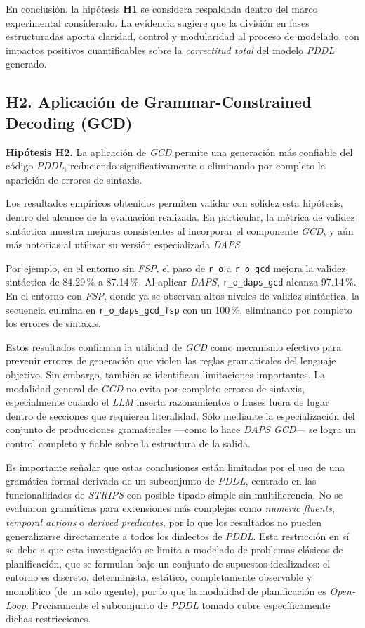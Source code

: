 En conclusión, la hipótesis \textbf{H1} se considera respaldada dentro del marco experimental considerado. La evidencia sugiere que la división en fases estructuradas aporta claridad, control y modularidad al proceso de modelado, con impactos positivos cuantificables sobre la \textit{correctitud total} del modelo \textit{PDDL} generado.

\subsection*{H2. Aplicación de Grammar-Constrained Decoding (GCD)}

\textbf{Hipótesis H2.} La aplicación de \textit{GCD}  permite una generación más confiable del código \textit{PDDL}, reduciendo significativamente o eliminando por completo la aparición de errores de sintaxis.

Los resultados empíricos obtenidos permiten validar con solidez esta hipótesis, dentro del alcance de la evaluación realizada. En particular, la métrica de validez sintáctica muestra mejoras consistentes al incorporar el componente \textit{GCD}, y aún más notorias al utilizar su versión especializada \textit{DAPS}.

Por ejemplo, en el entorno sin \textit{FSP}, el paso de \texttt{r\_o} a \texttt{r\_o\_gcd} mejora la validez sintáctica de 84.29\,\% a 87.14\,\%. Al aplicar \textit{DAPS}, \texttt{r\_o\_daps\_gcd} alcanza 97.14\,\%. En el entorno con \textit{FSP}, donde ya se observan altos niveles de validez sintáctica, la secuencia culmina en \texttt{r\_o\_daps\_gcd\_fsp} con un 100\,\%, eliminando por completo los errores de sintaxis.

Estos resultados confirman la utilidad de \textit{GCD} como mecanismo efectivo para prevenir errores de generación que violen las reglas gramaticales del lenguaje objetivo. Sin embargo, también se identifican limitaciones importantes. La modalidad general de \textit{GCD} no evita por completo errores de sintaxis, especialmente cuando el \textit{LLM} inserta razonamientos o frases fuera de lugar dentro de secciones que requieren literalidad. Sólo mediante la especialización del conjunto de producciones gramaticales —como lo hace \textit{DAPS GCD}— se logra un control completo y fiable sobre la estructura de la salida.

Es importante señalar que estas conclusiones están limitadas por el uso de una gramática formal derivada de un subconjunto de \textit{PDDL}, centrado en las funcionalidades de \textit{STRIPS} con posible tipado simple sin multiherencia. No se evaluaron gramáticas para extensiones más complejas como \textit{numeric fluents}, \textit{temporal actions} o \textit{derived predicates}, por lo que los resultados no pueden generalizarse directamente a todos los dialectos de \textit{PDDL}. Esta restricción en sí se debe a que esta investigación se limita a modelado de problemas clásicos de planificación, que se formulan bajo un conjunto de supuestos idealizados: el entorno es discreto, determinista, estático, completamente observable y monolítico (de un solo agente), por lo que la modalidad de planificación es \textit{Open-Loop}. Precisamente el subconjunto de \textit{PDDL} tomado cubre específicamente dichas restricciones.

